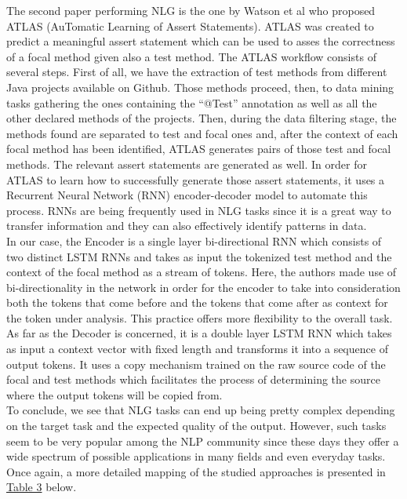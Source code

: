 The second paper performing NLG is the one by Watson et al \cite{9283916} who proposed ATLAS (AuTomatic Learning of Assert Statements). ATLAS was created to predict a meaningful assert statement which can be 
used to asses the correctness of a focal method given also a test method. The ATLAS workflow consists of several steps. First of all, we have the extraction of test methods from different Java projects available 
on Github. Those methods proceed, then, to data mining tasks gathering the ones containing the ``@Test'' annotation as well as all the other declared methods of the projects. Then, during the data filtering 
stage, the methods found are separated to test and focal ones and, after the context of each focal method has been identified, ATLAS generates pairs of those test and focal methods. The relevant assert statements 
are generated as well. In order for ATLAS to learn how to successfully generate those assert statements, it uses a Recurrent Neural Network (RNN) encoder-decoder model to automate this process. RNNs are 
being frequently used in NLG tasks since it is a great way to transfer information and they can also effectively identify patterns in data.\\

In our case, the Encoder is a single layer bi-directional RNN which consists of two distinct LSTM RNNs and takes as input the tokenized test method and the context of the focal method as a stream of tokens. 
Here, the authors made use of bi-directionality in the network in order for the encoder to take into consideration both the tokens that come before and the tokens that come after as context for the token 
under analysis. This practice offers more flexibility to the overall task.\\
As far as the Decoder is concerned, it is a double layer LSTM RNN which takes as input a context vector with fixed length and transforms it into a sequence of output tokens. It uses a copy mechanism trained 
on the raw source code of the focal and test methods which facilitates the process of determining the source where the output tokens will be copied from.\\

To conclude, we see that NLG tasks can end up being pretty complex depending on the target task and the expected quality of the output. However, such tasks seem to be very popular among the NLP community 
since these days they offer a wide spectrum of possible applications in many fields and even everyday tasks. Once again, a more detailed mapping of the studied approaches is presented 
in \hyperref[table3]{Table 3} below.

